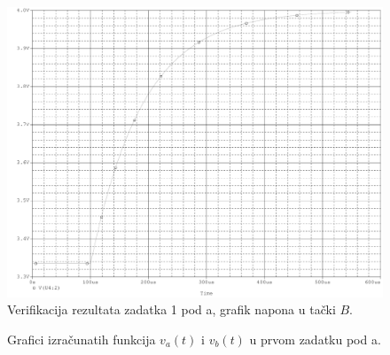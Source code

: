 \documentclass{article}
\begin{document}
                \begin{figure}[H]
                    \centering
                    \includegraphics[width=\textwidth,height=\textheight,keepaspectratio]{DZ1-1aB.pdf}
                    \caption{Verifikacija rezultata zadatka 1 pod a, grafik napona u tački $B$.}
                    \label{PSpice1aB}
                \end{figure}
                \begin{figure}[H]
                    \begin{center}
                        
                    \end{center}
                    \caption{Grafici izračunatih funkcija $v_a(t)$ i $v_b(t)$ u prvom zadatku pod a.}
                    \label{MPL1a}
                \end{figure}
\end{document}

